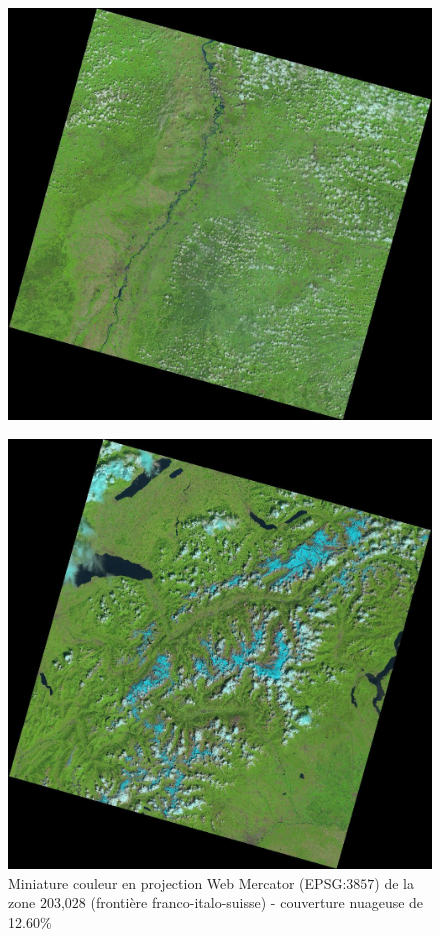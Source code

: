 \documentclass{book}
\begin{document}
\begin{figure}[H]
\begin{center}
\includegraphics[scale=0.2]{images/LC81950262013156LGN00.jpg}
\end{center}
\label{cloud4}
\end{figure}

\begin{figure}[H]
\begin{center}
\includegraphics[scale=0.2]{images/LC81950282013204LGN00.jpg}
\end{center}
\caption{Miniature couleur en projection Web Mercator (EPSG:$3857$) de la zone $203$,$028$ (frontière franco-italo-suisse) - couverture nuageuse de 12.60\%}
\label{cloud5}
\end{figure}
\end{document}
